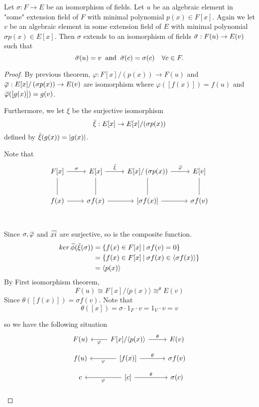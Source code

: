 \begin{corollary}
    Let $\sigma : F \to E$ be an isomorphism of fields. Let $u$ be an algebraic element in 
    "some" extension field of $F$ with minimal polynomial $p(x) \in F[x]$. Again we let 
    $v$ be an algebraic element in some extension field of $E$ with minimal polynomial 
    $\sigma p(x) \in E[x]$. Then $\sigma$ extends to an isomorphism of fields 
    $\,\overline{\!{\sigma}} : F(u) \to E(v)$ such that 
    \[
        \,\overline{\!{\sigma}}(u) = v \> \text{ and } \> \,\overline{\!{\sigma}}(c) = \sigma(c) \quad \forall c \in F.
    \]
\end{corollary}
\begin{proof}
    By previous theorem, $\varphi:F[x]/\left( p(x) \right) \to F(u)$ and
    $\,\overline{\!{\varphi}}:E[x]/\left( \sigma p(x) \right) \to E(v)$ are isomorphism where 
    $\varphi( \left[ f(x) \right]) = f(u)$ and $\,\overline{\!{\varphi}}( \left[ g(x) \right]) = g(v)$.

    Furthermore, we let $\xi $ be the surjective isomorphism
    \[
        \,\overline{\!{\xi}}: E[x] \to E[x]/(\sigma p(x))
    \]
    defined by $\,\overline{\!{\xi}}(g(x)) = |g(x)|$.
    
    Note that
    \[
        \begin{tikzcd}[row sep=2.5em]
            F[x] \arrow[r, "\sigma"] \arrow[dash]{d} & E[x] \arrow[r, "\olsi{\xi}"] \arrow[dash]{d} & E[x] / \left( \sigma p(x)\right) \arrow[r, "\olsi{\varphi}"] \arrow[dash]{d}& E[v] \arrow[dash]{d}\\
            f(x) \arrow[r] & \sigma f(x) \arrow[r] &  \left[ \sigma f(x) \right] \arrow[r] & \sigma f(v)\\
        \end{tikzcd}
    \]
    Since $\sigma, \,\overline{\!{\varphi}}$ and $\,\overline{\!{xi}}$ are surjective, so is the composite function.
    \begin{align*}
        ker\, \,\overline{\!{\phi}}(\,\overline{\!{\xi}}(\sigma)) &= 
        \{ f(x) \in F[x] \> | \> \sigma f(v) = 0 \}\\
        &= \{ f(x) \in F[x] \> | \> \sigma f(x) \in \langle \sigma f(x) \rangle \}\\
        &= \langle p(x) \rangle
    \end{align*}
    By First isomorphism theorem,
    \[
        F(u) \cong F[x] / \langle p(x) \rangle \cong^{\theta} E(v)
    \]
    Since $\theta([f(x)]) = \sigma f(v)$. Note that 
    \[
        \theta([x]) = \sigma \cdot 1_F \cdot v = 1_V \cdot v = v
    \]

    so we have the following situation
    \[
        \begin{tikzcd}[row sep=1.0em]
            F(u) & F[x] / \langle p(x) \rangle \arrow[l, "\varphi"] \arrow[r, "\theta"] & E(v)\\
            f(u) & \left[ f(x) \right] \arrow[l, "\varphi"] \arrow[r, "\theta"] & \sigma f(v)\\
            c & \left[ c \right] \arrow[l, "\varphi"] \arrow[r, "\theta"] & \sigma(c)\\
        \end{tikzcd}
    \]


\end{proof}
